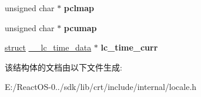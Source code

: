\begin{DoxyCompactItemize}
\mbox{\label{struct_m_s_v_c_r_t__threadlocaleinfostruct_af7953a1fcbc545203fb3e38e4f08b295}} 
unsigned char $\ast$ {\bfseries pclmap}
\item 
\mbox{\label{struct_m_s_v_c_r_t__threadlocaleinfostruct_a4e6b0ce6a409bd9c37769c578a6bd923}} 
unsigned char $\ast$ {\bfseries pcumap}
\item 
\mbox{\label{struct_m_s_v_c_r_t__threadlocaleinfostruct_a8b46fec96c4f2f1b80d22f990d689710}} 
\hyperlink{interfacestruct}{struct} \hyperlink{struct____lc__time__data}{\+\_\+\+\_\+lc\+\_\+time\+\_\+data} $\ast$ {\bfseries lc\+\_\+time\+\_\+curr}
\end{DoxyCompactItemize}


该结构体的文档由以下文件生成\+:\begin{DoxyCompactItemize}
\item 
E\+:/\+React\+O\+S-\/0../sdk/lib/crt/include/internal/locale.\+h\end{DoxyCompactItemize}
